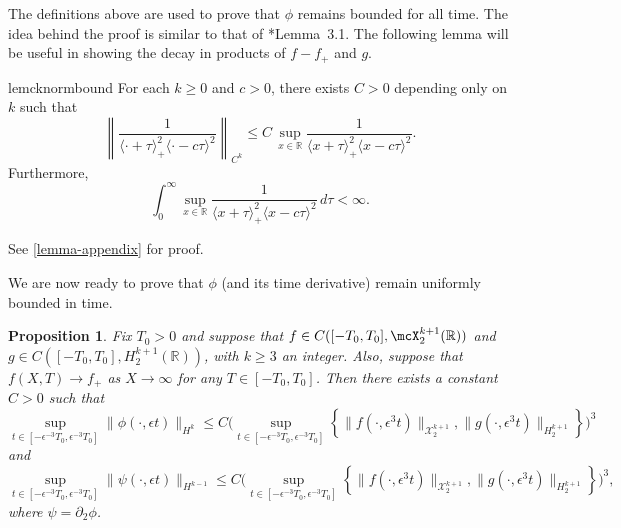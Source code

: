 \documentclass[oneside,reqno]{amsart}
\newcommand{\R}{\mathbb{R}}
\newtheorem{prop}{Proposition}[section]
\begin{document}
The definitions above are used to prove that \(\phi\) remains bounded for all time. The idea behind the proof is similar to that of \cite{schneider2000counter}*{Lemma~3.1}. The following lemma will be useful in showing the decay in products of \(f-f_+\) and \(g\).
\begin{restatable}{lem}{cknormbound}
	For each \(k\geq 0\) and \(c > 0\), there exists \(C> 0\) depending only on \(k\) such that 
	\begin{equation}\label{Ck-bound}
		\left \| \frac 1 {\langle \cdot +\tau\rangle_+^2 \langle \cdot - c\tau \rangle^2} \right \|_{C^k} \leq C\, \sup_{x\in\mathbb R} \frac 1 {\langle x +\tau\rangle_+^2 \langle x -c \tau \rangle^2}.
	\end{equation}
	Furthermore,
	\begin{equation}\label{sup-integrable}
		\int_0^\infty \sup_{x\in\mathbb R} \frac 1 {\langle x +\tau\rangle_+^2 \langle x -c \tau \rangle^2}\, d\tau <\infty.
	\end{equation}
\end{restatable}
See \cref{lemma-appendix} for proof. 

We are now ready to prove that \(\phi\) (and its time derivative) remain uniformly bounded in time.
\begin{prop}
	Fix \(T_0> 0\) and suppose that \(f \in C([-T_0,T_0], \mcX_2^{k+1}(\R))\) and \(g \in C([-T_0,T_0], H^{k+1}_2(\R)) \), with \(k\geq 3\) an integer. Also, suppose that \(f(X,T)\to f_+\) as \(X\to \infty\) for any \(T\in[-T_0,T_0]\). Then there exists a constant \(C>0\) such that 
	\begin{equation}\label{phi-bound}
		\sup_{t\in[-\epsilon^{-3}T_0,\epsilon^{-3}T_0]} \|\phi(\cdot,\epsilon t)\|_{H^k} \leq C \Bigg( \sup_{t\in[-\epsilon^{-3}T_0,\epsilon^{-3}T_0]} \left\{\| f(\cdot, \epsilon^3t) \|_{\mathcal X^{k+1}_{2}},  \| g(\cdot, \epsilon^3t) \|_{H^{k+1}_2} \right\}\Bigg)^3
	\end{equation}
	and
	\begin{equation}\label{psi-bound}
		\sup_{t\in[-\epsilon^{-3}T_0,\epsilon^{-3}T_0]} \|\psi(\cdot,\epsilon t)\|_{H^{k-1}} \leq C \Bigg( \sup_{t\in[-\epsilon^{-3}T_0,\epsilon^{-3}T_0]} \left\{\| f(\cdot, \epsilon^3t) \|_{\mathcal X^{k+1}_{2}},  \| g(\cdot, \epsilon^3t) \|_{H^{k+1}_2} \right\}\Bigg)^3,
	\end{equation}
	where \(\psi = \partial_2 \phi\).
\end{prop}
\end{document}
